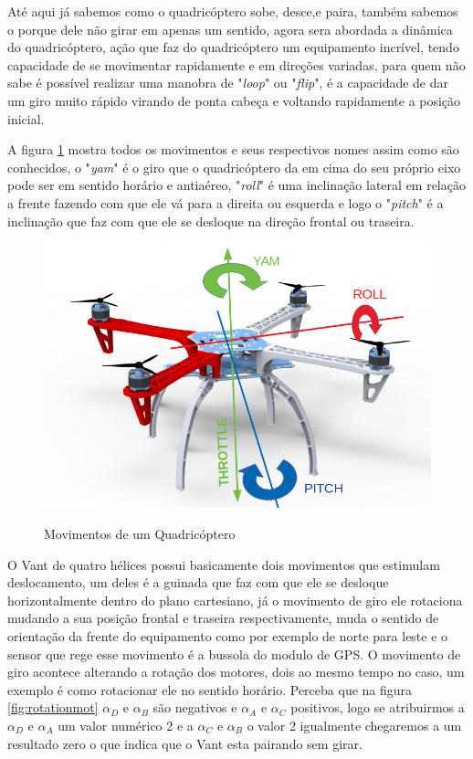 Até aqui já sabemos como o quadricóptero sobe, desce,e paira, também sabemos o porque dele não girar em apenas um sentido, agora sera abordada a dinâmica do quadricóptero, ação que faz do quadricóptero um equipamento incrível, tendo capacidade de se movimentar rapidamente e em direções variadas, para quem não sabe é possível realizar uma manobra de "\textit{loop}" ou "\textit{flip}", é a capacidade de dar um giro muito rápido virando de ponta cabeça e voltando rapidamente a posição inicial. 

A figura \ref{fig:yamrollpitch} mostra todos os movimentos e seus respectivos nomes assim como são conhecidos, o "\textit{yam}" é o giro que o quadricóptero da em cima do seu próprio eixo pode ser em sentido horário e antiaéreo, "\textit{roll}" é uma inclinação lateral em relação a frente fazendo com que ele vá para a direita ou esquerda e logo o "\textit{pitch}" é a inclinação que faz com que ele se desloque na direção frontal ou traseira. 

\begin{figure}[htb]
  \centering
  \caption{Movimentos de um Quadricóptero}
  \includegraphics[scale=.3]{figs/F450.png}
  \label{fig:yamrollpitch}
\end{figure}

O Vant de quatro hélices possui basicamente dois movimentos que estimulam deslocamento, um deles é a guinada que faz com que ele se desloque horizontalmente dentro do plano cartesiano, já o movimento de giro ele rotaciona mudando a sua posição frontal e traseira respectivamente, muda o sentido de orientação da frente do equipamento como por exemplo de norte para leste e o sensor que rege esse movimento é a bussola do modulo de GPS. O movimento de giro acontece alterando a rotação dos motores, dois ao mesmo tempo no caso, um exemplo é como rotacionar ele no sentido horário. Perceba que na figura \ref{fig:rotationmot} $\alpha_{D}$ e $\alpha_{B}$ são negativos e $\alpha_{A}$ e $\alpha_{C}$ positivos, logo se atribuirmos a $\alpha_{D}$ e $\alpha_{A}$ um valor numérico 2 e a $\alpha_{C}$ e $\alpha_{B}$ o valor 2 igualmente chegaremos a um resultado zero o que indica que o Vant esta pairando sem girar.  

